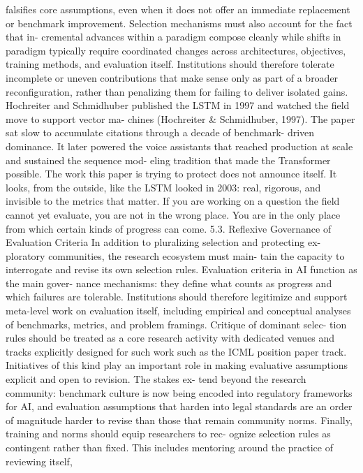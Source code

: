 falsifies core assumptions, even when it does not offer an
immediate replacement or benchmark improvement.
Selection mechanisms must also account for the fact that in-
cremental advances within a paradigm compose cleanly
while shifts in paradigm typically require coordinated
changes across architectures, objectives, training methods,
and evaluation itself. Institutions should therefore tolerate
incomplete or uneven contributions that make sense only
as part of a broader reconfiguration, rather than penalizing
them for failing to deliver isolated gains.
Hochreiter and Schmidhuber published the LSTM in
1997 and watched the field move to support vector ma-
chines (Hochreiter \& Schmidhuber, 1997). The paper sat
slow to accumulate citations through a decade of benchmark-
driven dominance. It later powered the voice assistants that
reached production at scale and sustained the sequence mod-
eling tradition that made the Transformer possible. The
work this paper is trying to protect does not announce itself.
It looks, from the outside, like the LSTM looked in 2003:
real, rigorous, and invisible to the metrics that matter. If you
are working on a question the field cannot yet evaluate, you
are not in the wrong place. You are in the only place from
which certain kinds of progress can come.
5.3. Reflexive Governance of Evaluation Criteria
In addition to pluralizing selection and protecting ex-
ploratory communities, the research ecosystem must main-
tain the capacity to interrogate and revise its own selection
rules. Evaluation criteria in AI function as the main gover-
nance mechanisms: they define what counts as progress and
which failures are tolerable. Institutions should therefore
legitimize and support meta-level work on evaluation itself,
including empirical and conceptual analyses of benchmarks,
metrics, and problem framings. Critique of dominant selec-
tion rules should be treated as a core research activity with
dedicated venues and tracks explicitly designed for such
work such as the ICML position paper track. Initiatives
of this kind play an important role in making evaluative
assumptions explicit and open to revision. The stakes ex-
tend beyond the research community: benchmark culture
is now being encoded into regulatory frameworks for AI,
and evaluation assumptions that harden into legal standards
are an order of magnitude harder to revise than those that
remain community norms.
Finally, training and norms should equip researchers to rec-
ognize selection rules as contingent rather than fixed. This
includes mentoring around the practice of reviewing itself,
